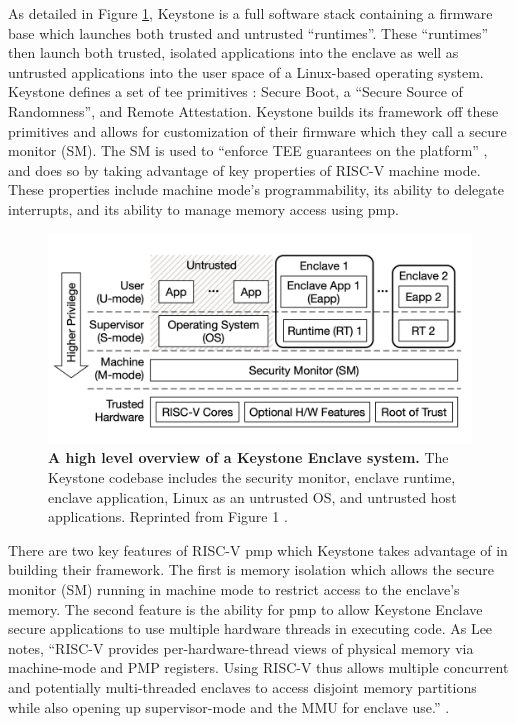 As detailed in Figure \ref{figure:keystone-overview}, Keystone is a full software stack containing a firmware base which launches both trusted and untrusted ``runtimes''. These ``runtimes'' then launch both trusted, isolated applications into the enclave as well as untrusted applications into the user space of a Linux-based operating system. Keystone defines a set of \gls{tee} primitives \cite{lee2020keystone}: Secure Boot, a ``Secure Source of Randomness'', and Remote Attestation. Keystone builds its framework off these primitives and allows for customization of their firmware which they call a secure monitor (SM). The SM is used to ``enforce TEE guarantees on the platform'' \cite{lee2019keystone}, and does so by taking advantage of key properties of RISC-V machine mode. These properties include machine mode's programmability, its ability to delegate interrupts, and its ability to manage memory access using \gls{pmp}.

\begin{figure}[ht]
\includegraphics[width=\textwidth]{img/keystone-diagram-tmp.png}
\caption[Keystone System Overview]{\textbf{A high level overview of a Keystone Enclave system.} The Keystone codebase includes the security monitor, enclave runtime, enclave application, Linux as an untrusted OS, and untrusted host applications. Reprinted from Figure 1 \cite{lee2019keystone}.
\label{figure:keystone-overview}}
\end{figure}

There are two key features of RISC-V \gls{pmp} which Keystone takes advantage of in building their framework. The first is memory isolation which allows the secure monitor (SM) running in machine mode to restrict access to the enclave's memory. The second feature is the ability for \gls{pmp} to allow Keystone Enclave secure applications to use multiple hardware threads in executing code. As Lee notes, ``RISC-V provides per-hardware-thread views of physical memory via machine-mode and PMP registers. Using RISC-V thus allows multiple concurrent and potentially multi-threaded enclaves to access disjoint memory partitions while also opening up supervisor-mode and the MMU for enclave use.'' \cite{lee2020keystone}. 

